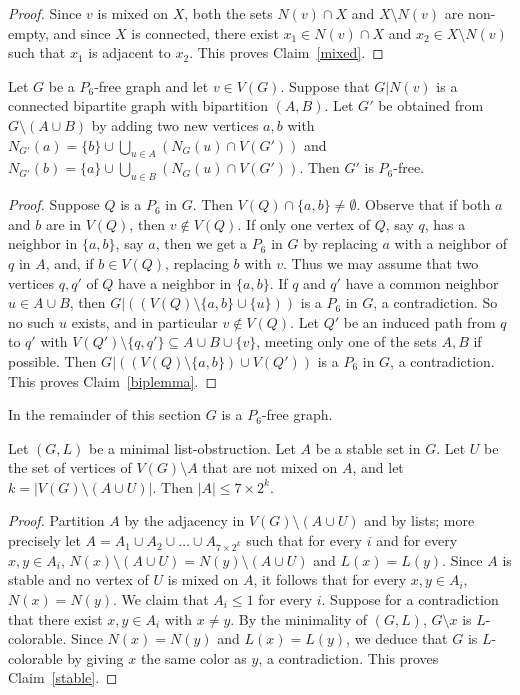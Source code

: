 \documentclass[11pt]{article}
\begin{document}
\begin{proof}
Since $v$ is mixed on $X$, both the sets $N(v) \cap X$ and $X \setminus N(v)$
are non-empty, and since $X$ is connected, there exist $x_1 \in N(v) \cap X$
and $x_2 \in X \setminus N(v)$ such that $x_1$ is adjacent to $x_2$. This
proves Claim~\ref{mixed}.
\end{proof}


\begin{claim}\label{biplemma}
Let $G$ be a $P_6$-free graph and let $v \in V(G)$. 
Suppose that $G|N(v)$ is a connected bipartite graph with bipartition $(A,B)$. 
Let $G'$ be obtained from $G\setminus (A \cup B)$ 
by adding two new vertices $a,b$ with
$N_{G'}(a)=\{b\}  \cup \bigcup_{u \in A} (N_G(u) \cap V(G'))$
and $N_{G'}(b)=\{a\} \cup \bigcup_{u \in B} (N_G(u) \cap V(G'))$. 
Then $G'$ is $P_6$-free.
\end{claim}
\begin{proof}
Suppose $Q$ is a $P_6$ in $G$. Then $V(Q) \cap \{a,b\} \neq \emptyset$.
Observe that if both $a$ and $b$ are in  $V(Q)$, then $v \not \in V(Q)$.
If only one vertex of $Q$, say $q$,  has a neighbor in $\{a,b\}$, say $a$,
then we get a $P_6$ in $G$ by replacing $a$ with a neighbor of $q$ in $A$, 
and, if $b \in V(Q)$, replacing $b$ with $v$. Thus we may assume that
two vertices $q,q'$ of $Q$ have a neighbor in $\{a,b\}$. If $q$ and $q'$ have a
common neighbor $u \in A \cup B$, then $G|((V(Q) \setminus \{a,b\} \cup \{u\}))$
is a $P_6$ in $G$, a contradiction. So no such $u$ exists, and in particular
$v \not \in V(Q)$. 
Let $Q'$ be an induced path from $q$ to 
$q'$ with $V(Q') \setminus \{q,q'\} \subseteq A \cup B \cup \{v\}$,
meeting only one of the sets $A,B$ if possible. Then 
$G|((V(Q) \setminus \{a,b\}) \cup V(Q'))$
is a $P_6$ in $G$, a contradiction. This proves Claim~\ref{biplemma}.
\end{proof}

In the remainder of this section $G$ is a $P_6$-free graph.

\begin{claim}
\label{stable}
Let $(G,L)$ be a minimal list-obstruction.
Let $A$ be a stable  set in $G$. Let $U$ be the set of vertices of 
$V(G) \setminus A$ that are not mixed on $A$, and let
$k=|V(G) \setminus (A \cup U)|$. Then $|A| \leq 7 \times 2^k$.
\end{claim}

\begin{proof}
Partition $A$ by the adjacency in 
$V(G) \setminus (A \cup U)$ and by lists; more precisely let $A=A_1\cup A_2\cup\ldots \cup A_{7 \times 2^k}$ such that for every $i$ and for every $x,y\in A_i$, 
$N(x) \setminus (A \cup U) =N(y) \setminus (A \cup U)$ and $L(x)=L(y)$.
Since $A$ is stable and no vertex of $U$ is mixed on $A$, it follows that
for every $x,y \in A_i$, $N(x)=N(y)$. 
We claim that  $A_i \leq 1$ for every $i$.
Suppose for a contradiction that there exist $x,y \in A_i$ with $x \neq y$. 
By the minimality of $(G,L)$, $G\setminus x$ is $L$-colorable. 
Since  $N(x)= N(y)$ and $L(x)=L(y)$, we deduce that $G$ is $L$-colorable by giving $x$ the same 
color as  $y$, a contradiction. This proves Claim~\ref{stable}.
\end{proof}
\end{document}
